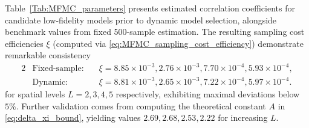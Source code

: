 Table~\ref{Tab:MFMC_parameters} presents estimated correlation coefficients for candidate low-fidelity models prior to dynamic model selection, alongside benchmark values from fixed 500-sample estimation. The resulting sampling cost efficiencies $\xi$ (computed via \eqref{eq:MFMC_sampling_cost_efficiency}) demonstrate remarkable consistency
%
\begin{alignat*}{2}
    &\text{Fixed-sample:}\quad &\xi = 8.85\times 10^{-3}, 2.76\times 10^{-3}, 7.70\times 10^{-4}, 5.93\times 10^{-4},\\
    &\text{Dynamic:}\quad &\xi =8.81\times 10^{-3}, 2.65\times 10^{-3}, 7.22\times 10^{-4},  5.97\times 10^{-4}.
\end{alignat*}
%
for spatial levels $L=2,3,4,5$ respectively, exhibiting maximal deviations below $5\%$. Further validation comes from computing the theoretical constant $A$ in \eqref{eq:delta_xi_bound}, yielding values $2.69, 2.68, 2.53, 2.22$ for increasing $L$. 




 






